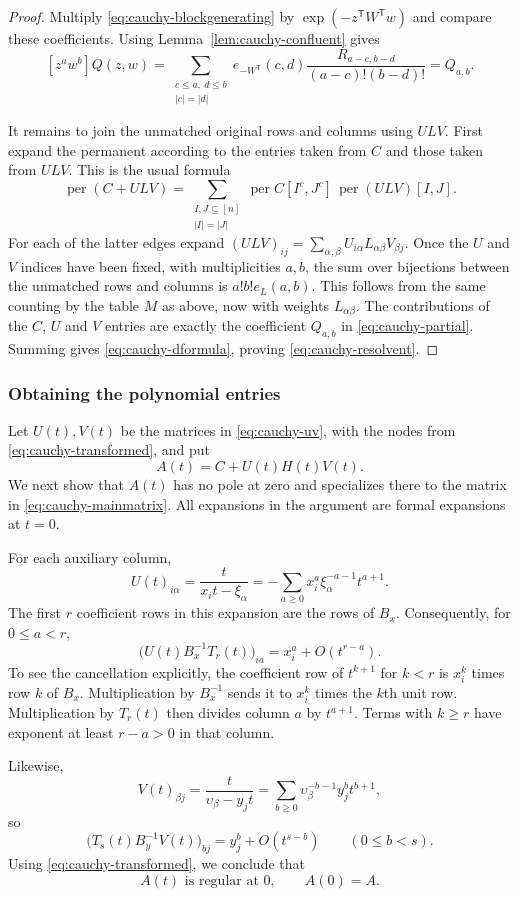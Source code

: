 \documentclass[11pt,reqno]{amsart}
\theoremstyle{remark}
\numberwithin{equation}{section}
\newcommand{\per}{\operatorname{per}}
\begin{document}
\begin{proof}
Multiply \eqref{eq:cauchy-blockgenerating} by
$\exp(-z^{\mathsf T}W^{\mathsf T}w)$ and compare these coefficients.
Using Lemma~\ref{lem:cauchy-confluent} gives
\[
 [z^a w^b]Q(z,w)=
 \sum_{\substack{c\leq a,\ d\leq b\\|c|=|d|}}
 e_{-W^{\mathsf T}}(c,d)
 \frac{R_{a-c,b-d}}{(a-c)!(b-d)!}=Q_{a,b}.
\]

It remains to join the unmatched original rows and columns using
$ULV$. First expand the permanent according to the entries taken
from $C$ and those taken from $ULV$. This is the usual formula
\[
 \per(C+ULV)=\sum_{\substack{I,J\subseteq[n]\\|I|=|J|}}
 \per C[I^c,J^c]\,\per(ULV)[I,J].
\]
For each of the latter edges expand
$(ULV)_{ij}=\sum_{\alpha,\beta}U_{i\alpha}L_{\alpha\beta}V_{\beta j}$.
Once the $U$ and $V$ indices have been fixed, with multiplicities
$a,b$, the sum over bijections between the unmatched rows and
columns is $a!b!e_L(a,b)$. This follows from the same counting
by the table $M$ as above, now with weights $L_{\alpha\beta}$.
The contributions of the $C$, $U$ and $V$ entries are exactly
the coefficient $Q_{a,b}$ in \eqref{eq:cauchy-partial}. Summing gives
\eqref{eq:cauchy-dformula}, proving \eqref{eq:cauchy-resolvent}.
\end{proof}

\subsubsection{Obtaining the polynomial entries}
Let $U(t),V(t)$ be the matrices in \eqref{eq:cauchy-uv}, with the nodes
from \eqref{eq:cauchy-transformed}, and put
\[
 A(t)=C+U(t)H(t)V(t).
\]
We next show that $A(t)$ has no pole at zero and specializes there
to the matrix in \eqref{eq:cauchy-mainmatrix}. All expansions in the argument
are formal expansions at $t=0$.

For each auxiliary column,
\[
 U(t)_{i\alpha}=\frac{t}{x_it-\xi_\alpha}
 =-\sum_{a\geq0}x_i^a\xi_\alpha^{-a-1}t^{a+1}.
\]
The first $r$ coefficient rows in this expansion are the rows of
$B_x$. Consequently, for $0\leq a<r$,
\[
 \bigl(U(t)B_x^{-1}T_r(t)\bigr)_{ia}
 =x_i^a+O(t^{r-a}).
\]
To see the cancellation explicitly, the coefficient row of
$t^{k+1}$ for $k<r$ is $x_i^k$ times row $k$ of $B_x$.
Multiplication by $B_x^{-1}$ sends it to $x_i^k$ times the
$k$th unit row. Multiplication by $T_r(t)$ then divides column
$a$ by $t^{a+1}$. Terms with $k\geq r$ have exponent at least
$r-a>0$ in that column.

Likewise,
\[
 V(t)_{\beta j}=\frac{t}{\upsilon_\beta-y_jt}
 =\sum_{b\geq0}\upsilon_\beta^{-b-1}y_j^b t^{b+1},
\]
so
\[
 \bigl(T_s(t)B_y^{-1}V(t)\bigr)_{bj}
 =y_j^b+O(t^{s-b})\qquad(0\leq b<s).
\]
Using \eqref{eq:cauchy-transformed}, we conclude that
\begin{equation}\label{eq:cauchy-specialization}
 A(t)\text{ is regular at }0,\qquad A(0)=A.
\end{equation}
\end{document}
